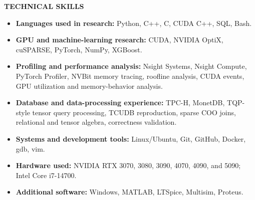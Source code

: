 \documentclass[11pt]{article}
\newcommand{\resheading}[1]{%
  \par\addvspace{10pt}%
  \noindent\colorbox{sectiongray}{%
    \parbox{\dimexpr\linewidth-2\fboxsep\relax}{\strut\small\textbf{#1}}%
  }\par\nobreak\vspace{4pt}\nopagebreak[4]%
}
\begin{document}
\resheading{TECHNICAL SKILLS}
\begin{itemize}[label={},leftmargin=0pt,itemsep=4pt]
  \item \textbf{Languages used in research:} Python, C++, C, CUDA C++, SQL, Bash.
  \item \textbf{GPU and machine-learning research:} CUDA, NVIDIA OptiX, cuSPARSE, PyTorch, NumPy, XGBoost.
  \item \textbf{Profiling and performance analysis:} Nsight Systems, Nsight Compute, PyTorch Profiler, NVBit memory tracing, roofline analysis, CUDA events, GPU utilization and memory-behavior analysis.
  \item \textbf{Database and data-processing experience:} TPC-H, MonetDB, TQP-style tensor query processing, TCUDB reproduction, sparse COO joins, relational and tensor algebra, correctness validation.
  \item \textbf{Systems and development tools:} Linux/Ubuntu, Git, GitHub, Docker, gdb, vim.
  \item \textbf{Hardware used:} NVIDIA RTX 3070, 3080, 3090, 4070, 4090, and 5090; Intel Core i7-14700.
  \item \textbf{Additional software:} Windows, MATLAB, LTSpice, Multisim, Proteus.
\end{itemize}
\end{document}
